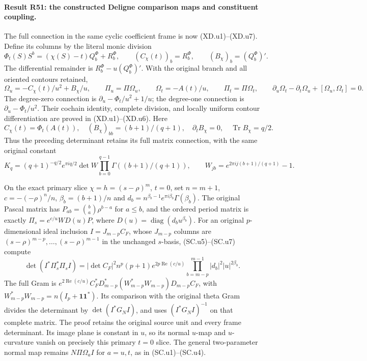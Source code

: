 \paragraph{Result R51: the constructed Deligne comparison maps and constituent coupling.}

The full connection in the same cyclic coefficient frame is
now (XD.u1)--(XD.u7).  Define its columns by the literal monic
division
\[
 \Phi_t(S)S^b=(\chi(S)-t)Q_b^\Phi+R_b^\Phi,\qquad
 (C_\chi(t))_b=R_b^\Phi,\qquad (B_\chi)_b=(Q_b^\Phi)' .
\]
The differential remainder is \(R_b^\Phi-u(Q_b^\Phi)'\).
With the original branch and all oriented contours retained,
\[
 \Omega_u=-C_\chi(t)/u^2+B_\chi/u,\qquad
 \Pi_u=\Pi\Omega_u,\qquad
 \Omega_t=-A(t)/u,\qquad \Pi_t=\Pi\Omega_t,
 \qquad
 \partial_u\Omega_t-\partial_t\Omega_u+
                          [\Omega_u,\Omega_t]=0 .
\]
The degree-zero connection is
\(\partial_u-\Phi_t/u^2+1/u\); the degree-one connection is
\(\partial_u-\Phi_t/u^2\).  Their cochain identity, complete
division, and locally uniform contour differentiation are proved
in (XD.u1)--(XD.u6).  Here
\[
 C_\chi(t)=\Phi_t(A(t)),\quad
 (B_\chi)_{bb}=(b+1)/(q+1),\quad
 \partial_tB_\chi=0,\quad \operatorname{Tr}B_\chi=q/2.
\]
Thus the preceding determinant retains its full matrix
connection, with the same original constant
\[
 K_q=(q+1)^{-q/2}e^{\pi iq/2}\det W
          \prod_{b=0}^{q-1}\Gamma((b+1)/(q+1)),\qquad
 W_{jb}=e^{2\pi i j(b+1)/(q+1)}-1.
\]

On the exact primary slice \(\chi=h=(s-\rho)^m\), \(t=0\),
set \(n=m+1\), \(c=-(-\rho)^n/n\),
\(\beta_b=(b+1)/n\) and
\(d_b=n^{\beta_b-1}e^{\pi i\beta_b}\Gamma(\beta_b)\).
The original Pascal matrix has
\(P_{ab}=\binom ba\rho^{b-a}\) for \(a\le b\), and
the ordered period matrix is exactly
\(\Pi_s=e^{c/u}WD(u)P\), where
\(D(u)=\operatorname{diag}(d_bu^{\beta_b})\).
For an original \(p\)-dimensional ideal inclusion
\(I=J_{m-p}C_F\), whose \(J_{m-p}\) columns are
\((s-\rho)^{m-p},\ldots,(s-\rho)^{m-1}\) in the unchanged
\(s\)-basis, (SC.u5)--(SC.u7) compute
\[
 \det(I^*\Pi_s^*\Pi_s I)
 =|\det C_F|^2n^p(p+1)e^{2p\operatorname{Re}(c/u)}
                \prod_{b=m-p}^{m-1}|d_b|^2|u|^{2\beta_b}.
\]
The full Gram is
\(e^{2\operatorname{Re}(c/u)}
C_F^*D_{m-p}^*(W_{m-p}^*W_{m-p})D_{m-p}C_F\), with
\(W_{m-p}^*W_{m-p}=n(I_p+\mathbf1\mathbf1^*)\).
Its comparison with the original theta Gram divides the
determinant by \(\det(I^*G_NI)\), and uses
\((I^*G_NI)^{-1}\) on that complete matrix.
The proof retains the original source unit and every frame
determinant.  Its image plane is constant in \(u\), so its normal
\(u\)-map and \(u\)-curvature vanish on precisely this primary
\(t=0\) slice.  The general two-parameter normal map remains
\(N\Pi\Omega_a I\) for \(a=u,t\), as in (SC.u1)--(SC.u4).


